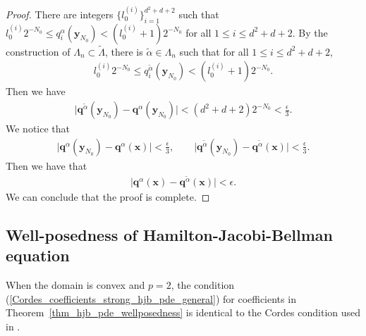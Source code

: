 \documentclass[12pt]{amsart}
\newcommand{\boldx}{\boldsymbol{x}}
\newcommand{\boldy}{\boldsymbol{y}}
\theoremstyle{definition}
\theoremstyle{remark}
\begin{document}
\begin{proof}
There are integers $\{ l_{0}^{(i)} \}_{i=1}^{d^{2}+d+2}$ such that 
$l_{0}^{(i)}2^{-N_{0}} \leq q_{i}^{\alpha}(\boldy_{N_{0}})< (l_{0}^{(i)}+1)2^{-N_{0}}$ 
for all $1 \leq i \leq d^{2}+d+2$. 
By the construction of $\Lambda_{n} \subset \tilde{\Lambda}$, there is 
$\tilde{\alpha} \in \Lambda_{n}$ such that for all $ 1 \leq i \leq d^{2} + d + 2 $,
\begin{align*}
l_{0}^{(i)}2^{-N_{0}} \leq q_{i}^{\tilde{\alpha}}(\boldy_{N_{0}}) < (l_{0}^{(i)} +1)2^{-N_{0}}.
\end{align*}
Then we have 
\begin{align*}
\vert \boldsymbol{q}^{\tilde{\alpha}}(\boldy_{N_{0}}) - \boldsymbol{q}^{\alpha}(\boldy_{N_{0}})\vert 
< (d^{2}+d+2) 2^{-N_{0}}< \frac{\epsilon}{3}.
\end{align*}
We notice that 
\begin{align*}
\vert \boldsymbol{q}^{\alpha}(\boldy_{N_{0}}) - \boldsymbol{q}^{\alpha}(\boldx) \vert < \frac{\epsilon}{3}, \qquad 
\vert \boldsymbol{q}^{\tilde{\alpha}}(\boldy_{N_{0}}) - \boldsymbol{q}^{\tilde{\alpha}}(\boldx) \vert < \frac{\epsilon}{3}.
\end{align*}
Then we have that 
\begin{align*}
\vert \boldsymbol{q}^{\alpha}(\boldx) - \boldsymbol{q}^{\tilde{\alpha}}(\boldx) \vert < \epsilon.
\end{align*}
We can conclude that the proof is complete. 
\end{proof}

\subsection{Well-posedness of Hamilton-Jacobi-Bellman equation}

When the domain is convex and $p=2$, the condition (\ref{Cordes_coefficients_strong_hjb_pde_general}) 
for coefficients in Theorem~\ref{thm_hjb_pde_wellposedness} is identical to the Cordes condition 
used in \cite{SmearsSuli2014}.
\end{document}
